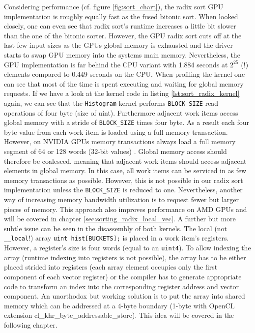 Considering performance (cf. figure \ref{fig:sort_chart}), the radix sort GPU implementation is roughly equally fast as the fused bitonic sort. When looked closely, one can even see that radix sort's runtime increases a little bit slower than the one of the bitonic sorter. However, the GPU radix sort cuts off at the last few input sizes as the GPUs global memory is exhausted and the driver starts to swap GPU memory into the systems main memory. Nevertheless, the GPU implementation is far behind the CPU variant with 1.884 seconds at $2^{25}$ (!) elements compared to 0.449 seconds on the CPU.
When profiling the kernel one can see that most of the time is spent executing and waiting for global memory requests. If we have a look at the kernel code in listing \ref{lst:sort_radix_kernel} again, we can see that the \lstinline!Histogram! kernel performs \lstinline!BLOCK_SIZE! read operations of four byte (size of uint). Furthermore adjacent work items access global memory with a stride of \lstinline!BLOCK_SIZE! times four byte. As a result each four byte value from each work item is loaded using a full memory transaction. However, on NVIDIA GPUs memory transactions always load a full memory segment of 64 or 128 words (32-bit values) \cite[p.13]{nvidia_opencl_best_practices}. Global memory access should therefore be coalesced, meaning that adjacent work items should access adjacent elements in global memory. In this case, all work items can be serviced in as few memory transactions as possible. However, this is not possible in our radix sort implementation unless the \lstinline!BLOCK_SIZE! is reduced to one. Nevertheless, another way of increasing memory bandwidth utilization is to request fewer but larger pieces of memory. This approach also improves performance on AMD GPUs and will be covered in chapter \ref{sec:sorting_radix_local_vec}.
A further but more subtle issue can be seen in the disassembly of both kernels. The local (not \lstinline!__local!!) array \lstinline!uint hist[BUCKETS];! is placed in a work item's registers. However, a register's size is four words (equal to an \lstinline!uint4!). To allow indexing the array (runtime indexing into registers is not possible), the array has to be either placed strided into registers (each array element occupies only the first component of each vector register) or the compiler has to generate appropriate code to transform an index into the corresponding register address and vector component. An unorthodox but working solution is to put the array into shared memory which can be addressed at a 4-byte boundary (1-byte with OpenCL extension cl\_khr\_byte\_addressable\_store). This idea will be covered in the following chapter.


